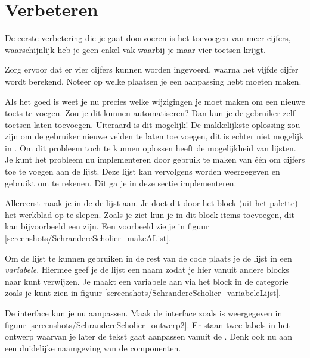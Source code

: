\section{Verbeteren}
De eerste verbetering die je gaat doorvoeren is het toevoegen van meer cijfers, waarschijnlijk heb je geen enkel vak waarbij je maar vier toetsen krijgt. 

 \begin{opgave}
    \opgVraag
Zorg ervoor dat er vier cijfers kunnen worden ingevoerd, waarna het vijfde cijfer wordt berekend. Noteer op welke plaatsen je een aanpassing hebt moeten maken.
\end{opgave}

Als het goed is weet je nu precies welke wijzigingen je moet maken om een nieuwe toets te voegen. Zou je dit kunnen automatiseren? Dan kun je de gebruiker zelf toetsen laten toevoegen. Uiteraard is dit mogelijk! De makkelijkste oplossing zou zijn om de gebruiker nieuwe velden te laten toe voegen, dit is echter niet mogelijk in \ai. Om dit probleem toch te kunnen oplossen heeft \ai de mogelijkheid van lijsten. Je kunt het probleem nu implementeren door gebruik te maken van \'e\'en  om cijfers toe te voegen aan de lijst. Deze lijst kan vervolgens worden weergegeven en gebruikt om te rekenen. Dit ga je in deze sectie implementeren.

Allereerst maak je in de  de lijst aan. Je doet dit door het  block (uit het  palette) het werkblad op te slepen. Zoals je ziet kun je in dit block items toevoegen, dit kan bijvoorbeeld een  zijn. Een voorbeeld zie je in figuur \ref{screenshots/SchrandereScholier_makeAList}.

Om de lijst te kunnen gebruiken in de rest van de code plaats je de lijst in een \emph{variabele}. Hiermee geef je de lijst een naam zodat je hier vanuit andere blocks naar kunt verwijzen. Je maakt een variabele aan via het  block in de categorie  zoals je kunt zien in figuur \ref{screenshots/SchrandereScholier_variabeleLijst}. 

 \begin{opgave}
    \opgVraag
De interface kun je nu aanpassen. Maak de interface zoals is weergegeven in figuur \ref{screenshots/SchrandereScholier_ontwerp2}. Er staan twee labels in het ontwerp waarvan je later de tekst gaat aanpassen vanuit de . Denk ook nu aan een duidelijke naamgeving van de componenten.
\end{opgave}

